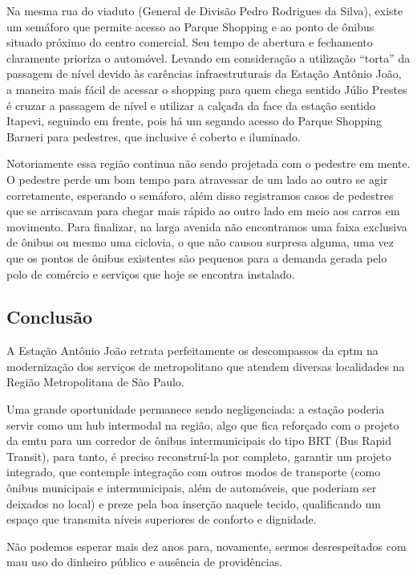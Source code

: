 \documentclass[11pt,fleqn]{book} %
\begin{document}
Na mesma rua do viaduto (General de Divisão Pedro Rodrigues da Silva), existe um semáforo que permite acesso ao Parque Shopping e ao ponto de ônibus situado próximo do centro comercial. Seu tempo de abertura e fechamento claramente prioriza o automóvel. Levando em consideração a utilização ``torta'' da passagem de nível devido às carências infraestruturais da Estação Antônio João, a maneira mais fácil de acessar o shopping para quem chega sentido Júlio Prestes é cruzar a passagem de nível e utilizar a calçada da face da estação sentido Itapevi, seguindo em frente, pois há um segundo acesso do Parque Shopping Barueri para pedestres, que inclusive é coberto e iluminado.

Notoriamente essa região continua não sendo projetada com o pedestre em mente. O pedestre perde um bom tempo para atravessar de um lado ao outro se agir corretamente, esperando o semáforo, além disso registramos casos de pedestres que se arriscavam para chegar mais rápido ao outro lado em meio aos carros em movimento. Para finalizar, na larga avenida não encontramos uma faixa exclusiva de ônibus ou mesmo uma ciclovia, o que não causou surpresa alguma, uma vez que os pontos de ônibus existentes são pequenos para a demanda gerada pelo polo de comércio e serviços que hoje se encontra instalado.

\subsection{Conclusão}

A Estação Antônio João retrata perfeitamente os descompassos da \gls{cptm} na modernização dos serviços de metropolitano que atendem diversas localidades na Região Metropolitana de São Paulo.

Uma grande oportunidade permanece sendo negligenciada: a estação poderia servir como um hub intermodal na região, algo que fica reforçado com o projeto da \gls{emtu} para um corredor de ônibus intermunicipais do tipo BRT (Bus Rapid Transit), para tanto, é preciso reconstruí-la por completo, garantir um projeto integrado, que contemple integração com outros modos de transporte (como ônibus municipais e intermunicipais, além de automóveis, que poderiam ser deixados no local) e preze pela boa inserção naquele tecido, qualificando um espaço que transmita níveis superiores de conforto e dignidade.

Não podemos esperar mais dez anos para, novamente, sermos desrespeitados com mau uso do dinheiro público e ausência de providências.
\end{document}
